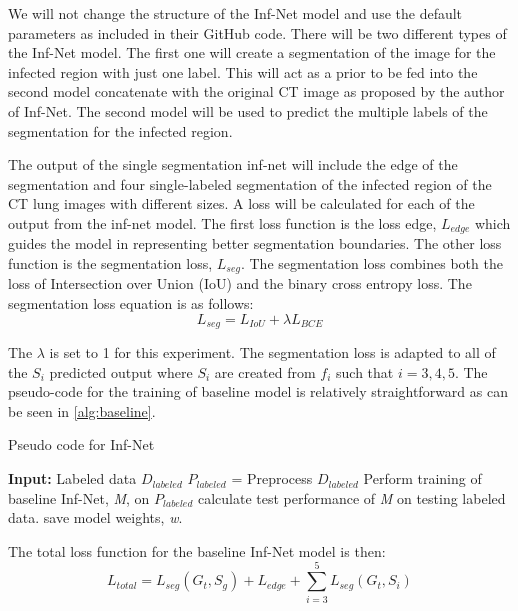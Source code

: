 We will not change the structure of the Inf-Net model and use the default parameters as included in their GitHub code. There will be two different types of the Inf-Net model. The first one will create a segmentation of the image for the infected region with just one label. This will act as a prior to be fed into the second model concatenate with the original CT image as proposed by the author of Inf-Net. The second model will be used to predict the multiple labels of the segmentation for the infected region.

The output of the single segmentation inf-net will include the edge of the segmentation and four single-labeled segmentation of the infected region of the CT lung images with different sizes. A loss will be calculated for each of the output from the inf-net model. The first loss function is the loss edge, $L_{edge}$ which guides the model in representing better segmentation boundaries. The other loss function is the segmentation loss, ${L_{seg}}$. The segmentation loss combines both the loss of Intersection over Union (IoU) and the binary cross entropy loss. The segmentation loss equation is as follows:
\begin{equation}
L_{seg} = L_{IoU} + \lambda L_{BCE}
\end{equation}

The $\lambda$ is set to 1 for this experiment. The segmentation loss is adapted to all of the ${S_i}$ predicted output where ${S_i}$ are created from $f_i$ such that $i={3,4,5}$. The pseudo-code for the training of baseline model is relatively straightforward as can be seen in \ref{alg:baseline}.
\begin{algorithm}
	\caption{Pseudo code for Inf-Net}
	\label{alg:baseline}
\begin{algorithmic}
\STATE \textbf{Input:} Labeled data $D_{labeled}$
\STATE $P_{labeled}$ = Preprocess $D_{labeled}$
\STATE Perform training of baseline Inf-Net, \textit{M}, on $P_{labeled}$
\STATE calculate test performance of \textit{M} on testing labeled data.
\STATE save model weights, \textit{w}.
\ENDFOR
\end{algorithmic}
\end{algorithm}

The total loss function for the baseline Inf-Net model is then:
\begin{equation}
L_{total} = L_{seg}(G_t, S_g) + L_{edge} + 	\sum_{i=3}^{5}L_{seg}(G_t, S_i)
\end{equation}

